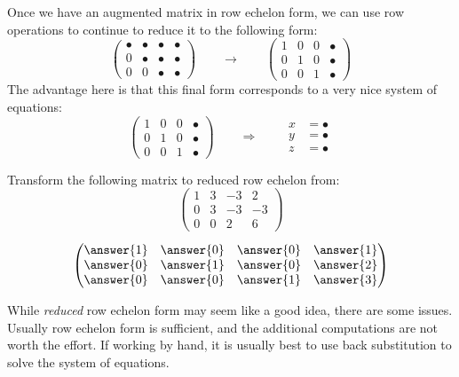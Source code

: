 \documentclass{ximera}
\begin{document}
Once we have an augmented matrix in row echelon form, we can use row
operations to continue to reduce it to the following form:
\[
\begin{pmatrix}
  \bullet & \bullet & \bullet & \bullet \\
     0   & \bullet & \bullet & \bullet \\
     0  &    0 & \bullet & \bullet
\end{pmatrix}
\qquad\longrightarrow\qquad
\begin{pmatrix}
  1 & 0 & 0  & \bullet \\
     0   & 1  &  0 & \bullet \\
     0  &    0 & 1 & \bullet
\end{pmatrix}
\]
The advantage here is that this final form corresponds to a very nice system of equations:
\[
  \left(
    \begin{array}{ccc|c}
      1 &   0 & 0 & \bullet  \\
      0 &   1 & 0 & \bullet \\
      0& 0  &  1 & \bullet
    \end{array}
  \right)
  \qquad\Longrightarrow\qquad
  \begin{aligned}
    x &= \bullet  \\
    y &= \bullet  \\
    z &=\bullet
  \end{aligned}
\]
\begin{question}
  Transform the following matrix to reduced row echelon from:
  \[
  \begin{pmatrix}
  1 & 3 & -3 & 2  \\
  0 & 3 & -3 & -3 \\
  0 & 0 &  2 & 6
  \end{pmatrix}
  \]
  \begin{prompt}
    \[
    \begin{pmatrix}
      \answer{1} & \answer{0} & \answer{0} & \answer{1} \\
      \answer{0} & \answer{1} & \answer{0} & \answer{2} \\
      \answer{0} & \answer{0} & \answer{1} & \answer{3}
    \end{pmatrix}
    \]
  \end{prompt}
\end{question}
While \textit{reduced} row echelon form may seem like a good idea,
there are some issues.  Usually row echelon form is sufficient, and
the additional computations are not worth the effort.  If working by
hand, it is usually best to use back substitution to solve the system
of equations.
\end{document}
